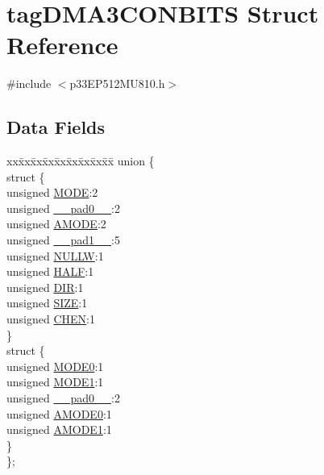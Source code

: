 \hypertarget{structtag_d_m_a3_c_o_n_b_i_t_s}{}\section{tag\+D\+M\+A3\+C\+O\+N\+B\+I\+TS Struct Reference}
\label{structtag_d_m_a3_c_o_n_b_i_t_s}


{\ttfamily \#include $<$p33\+E\+P512\+M\+U810.\+h$>$}

\subsection*{Data Fields}
\begin{DoxyCompactItemize}
\item 
\begin{tabbing}
xx\=xx\=xx\=xx\=xx\=xx\=xx\=xx\=xx\=\kill
union \{\\
\>struct \{\\
\>\>unsigned \hyperlink{structtag_d_m_a3_c_o_n_b_i_t_s_adc56ba18ff3f1599c85d222bee624424}{MODE}:2\\
\>\>unsigned \hyperlink{structtag_d_m_a3_c_o_n_b_i_t_s_adf71f3d8410c1f1dbbc96680a92c49af}{\_\_pad0\_\_}:2\\
\>\>unsigned \hyperlink{structtag_d_m_a3_c_o_n_b_i_t_s_ab3ff4e1f1b9a1037418ca7b6cb2e8f77}{AMODE}:2\\
\>\>unsigned \hyperlink{structtag_d_m_a3_c_o_n_b_i_t_s_acaf2d0924a107ec6e8d2e31febaf66f9}{\_\_pad1\_\_}:5\\
\>\>unsigned \hyperlink{structtag_d_m_a3_c_o_n_b_i_t_s_a1d3f7d04416314131889d1671a9287ad}{NULLW}:1\\
\>\>unsigned \hyperlink{structtag_d_m_a3_c_o_n_b_i_t_s_a1a715a64b2576f59401ac93d6f9a086a}{HALF}:1\\
\>\>unsigned \hyperlink{structtag_d_m_a3_c_o_n_b_i_t_s_ad6868749602045a76f36ffdf964dfd39}{DIR}:1\\
\>\>unsigned \hyperlink{structtag_d_m_a3_c_o_n_b_i_t_s_a5863cac6dc2cb330bdd0b1c66da70ffe}{SIZE}:1\\
\>\>unsigned \hyperlink{structtag_d_m_a3_c_o_n_b_i_t_s_a092934036fdfb8df5259db288fe438ca}{CHEN}:1\\
\>\} \\
\>struct \{\\
\>\>unsigned \hyperlink{structtag_d_m_a3_c_o_n_b_i_t_s_abc938903e74bff48935569d0c5b19035}{MODE0}:1\\
\>\>unsigned \hyperlink{structtag_d_m_a3_c_o_n_b_i_t_s_a7a9f7514566d0626724ce6c4b81b5ea2}{MODE1}:1\\
\>\>unsigned \hyperlink{structtag_d_m_a3_c_o_n_b_i_t_s_adf71f3d8410c1f1dbbc96680a92c49af}{\_\_pad0\_\_}:2\\
\>\>unsigned \hyperlink{structtag_d_m_a3_c_o_n_b_i_t_s_a0a1f894a2695c1388a5412244636805b}{AMODE0}:1\\
\>\>unsigned \hyperlink{structtag_d_m_a3_c_o_n_b_i_t_s_a3fde4abc0dc3db6fef6afc28c565ce3e}{AMODE1}:1\\
\>\} \\
\}; \\


\end{tabbing}
\end{DoxyCompactItemize}
